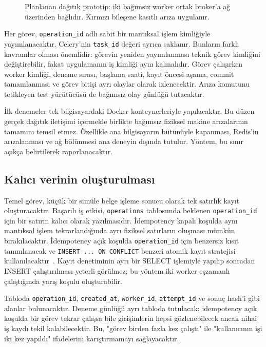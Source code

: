 \documentclass[conference,a4paper]{IEEEtran}
\newcommand{\code}[1]{\texttt{#1}}
\begin{document}
\begin{figure}[t]
\centering
\resizebox{\columnwidth}{!}{}
\caption{Planlanan dağıtık prototip: iki bağımsız worker ortak broker'a ağ üzerinden bağlıdır. Kırmızı bileşene kasıtlı arıza uygulanır.}
\label{fig:arch}
\end{figure}

Her görev, \code{operation\_id} adlı sabit bir mantıksal işlem kimliğiyle yayımlanacaktır. Celery'nin \code{task\_id} değeri ayrıca saklanır. Bunların farklı kavramlar olması önemlidir: görevin yeniden yayımlanması teknik görev kimliğini değiştirebilir, fakat uygulamanın iş kimliği aynı kalmalıdır. Görev çalışırken worker kimliği, deneme sırası, başlama saati, kayıt öncesi aşama, commit tamamlanması ve görev bitişi ayrı olaylar olarak izlenecektir. Arıza komutunu tetikleyen test yürütücüsü de bağımsız olay günlüğü tutacaktır.

İlk denemeler tek bilgisayardaki Docker konteynerleriyle yapılacaktır. Bu düzen gerçek dağıtık iletişimi içermekle birlikte bağımsız fiziksel makine arızalarının tamamını temsil etmez. Özellikle ana bilgisayarın bütünüyle kapanması, Redis'in arızalanması ve ağ bölünmesi ana deneyin dışında tutulur. Yöntem, bu sınır açıkça belirtilerek raporlanacaktır.

\subsection{Kalıcı verinin oluşturulması}
Temel görev, küçük bir simüle belge işleme sonucu olarak tek satırlık kayıt oluşturacaktır. Başarılı iş etkisi, \code{operations} tablosunda beklenen \code{operation\_id} için bir satırın kalıcı olarak yazılmasıdır. İdempotency kapalı koşulda aynı mantıksal işlem tekrarlandığında ayrı fiziksel satırların oluşması mümkün bırakılacaktır. İdempotency açık koşulda \code{operation\_id} için benzersiz kısıt tanımlanacak ve \code{INSERT ... ON CONFLICT} benzeri atomik kayıt stratejisi kullanılacaktır~\cite{postgresunique}. Kayıt denetiminin ayrı bir SELECT işlemiyle yapılıp sonradan INSERT çalıştırılması yeterli görülmez; bu yöntem iki worker eşzamanlı çalıştığında yarış koşulu oluşturabilir.

Tabloda \code{operation\_id}, \code{created\_at}, \code{worker\_id}, \code{attempt\_id} ve sonuç hash'i gibi alanlar bulunacaktır. Deneme günlüğü ayrı tabloda tutulacak; idempotency açık koşulda bir görev tekrar çalışsa bile girişimlerin hepsi gözlenebilecek ancak nihai iş kaydı tekil kalabilecektir. Bu, "görev birden fazla kez çalıştı" ile "kullanıcının işi iki kez yapıldı" ifadelerini karıştırmamayı sağlayacaktır.
\end{document}
